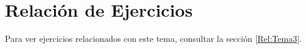\begin{comment}
Recordemos el Teorema de Sylvester, que sirve para diagonzalizar matrices simétricas:
\begin{teo}[Sylvester]
    Sea $M\in \cc{S}_n(\bb{R})$. Entonces, existe una matriz regular $P$ de orden $n$ tal que:
    \begin{equation*}
        P^tMP = \left(\begin{array}{ccc}
            -I_a &  \\
             & I_b \\
             && 0_c
        \end{array}\right)
    \end{equation*}
    donde $a$ es el índice de $M$, $c$ su nulidad; y $a+b+c=n$.
\end{teo}

Además, contamos con esta conocida regla:
\begin{lema}[Descartes]
    El número de raíces positivas de un polinomio con coeficientes reales ordenados es, como máximo, el número de cambios de signo entre sus coeficientes.
\end{lema}

\begin{teo}
    Sea $f:\bb{R}^n \to \bb{R}^n$ una biyección afín y $C$ una hipercuádrica. Entonces, $f(C)$ es otra hipercuádrica.
\end{teo}

\begin{definicion}
    Dos hipercuádricas $C_1$ y $C_2$ de $\bb{R}^n$ se dicen equivalentes si existe una biyección afín $f : \bb{R}^n \to \bb{R}^n$ tal que $f(C_1) = C_2$.
\end{definicion}
\end{comment}







\section{Relación de Ejercicios}

Para ver ejercicios relacionados con este tema, consultar la sección \ref{Rel:Tema3}.